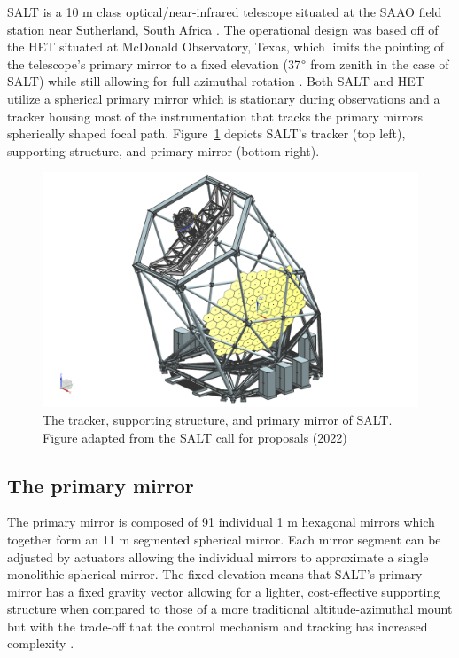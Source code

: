 \gls{SALT} is a 10 m class optical/near-infrared telescope situated at the \gls{SAAO} field station near Sutherland, South Africa \citep{SALT_optical_design}. The operational design was based off of the \gls{HET} situated at McDonald Observatory, Texas, which limits the pointing of the telescope's primary mirror to a fixed elevation (37$\degree$ from zenith in the case of SALT) while still allowing for full azimuthal rotation \citep{HET}. Both SALT and HET utilize a spherical primary mirror which is stationary during observations and a tracker housing most of the instrumentation that tracks the primary mirrors spherically shaped focal path. Figure~\ref{fig:SALT_telescope} depicts \gls{SALT}'s tracker (top left), supporting structure, and primary mirror (bottom right).

\begin{figure}[t]
  \centering
  \includegraphics[width = 15cm]{figures/2_SALT_telescope.png}
  \caption{The tracker, supporting structure, and primary mirror of SALT. Figure adapted from the SALT call for proposals (2022)\protect\footnotemark}
  \label{fig:SALT_telescope}
\end{figure}

\subsection{The primary mirror}

The primary mirror is composed of 91 individual 1 m hexagonal mirrors which together form an 11 m segmented spherical mirror. Each mirror segment can be adjusted by actuators allowing the individual mirrors to approximate a single monolithic spherical mirror. The fixed elevation means that SALT's primary mirror has a fixed gravity vector allowing for a lighter, cost-effective supporting structure when compared to those of a more traditional altitude-azimuthal mount but with the trade-off that the control mechanism and tracking has increased complexity \citep{SALT_design}.

